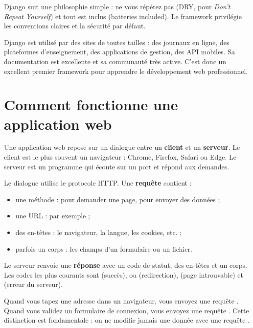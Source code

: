 \begin{retenir}
Django suit une philosophie simple : \og ne vous répétez pas \fg{} (DRY, pour
\emph{Don't Repeat Yourself}) et \og tout est inclus \fg{} (batteries included).
Le framework privilégie les conventions claires et la sécurité par défaut.
\end{retenir}

Django est utilisé par des sites de toutes tailles : des journaux en ligne, des
plateformes d'enseignement, des applications de gestion, des API mobiles. Sa
documentation est excellente et sa communauté très active. C'est donc un excellent
premier framework pour apprendre le développement web professionnel.

\section{Comment fonctionne une application web}

Une application web repose sur un dialogue entre un \textbf{client} et un
\textbf{serveur}. Le client est le plus souvent un navigateur : Chrome, Firefox,
Safari ou Edge. Le serveur est un programme qui écoute sur un port et répond aux
demandes.

Le dialogue utilise le protocole HTTP. Une \textbf{requête} contient :
\begin{itemize}
  \item une méthode :  pour demander une page,  pour envoyer
        des données ;
  \item une URL : par exemple  ;
  \item des en-têtes : le navigateur, la langue, les cookies, etc. ;
  \item parfois un corps : les champs d'un formulaire ou un fichier.
\end{itemize}

Le serveur renvoie une \textbf{réponse} avec un code de statut, des en-têtes et un
corps. Les codes les plus courants sont  (succès),  ou
 (redirection),  (page introuvable) et  (erreur du
serveur).

\begin{note}
Quand vous tapez une adresse dans un navigateur, vous envoyez une requête
. Quand vous validez un formulaire de connexion, vous envoyez une requête
. Cette distinction est fondamentale : on ne modifie jamais une donnée
avec une requête .
\end{note}

